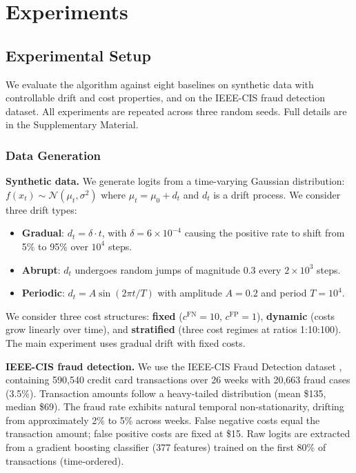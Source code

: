 \documentclass[12pt,a4paper]{article}
\begin{document}
\section{Experiments}
\label{sec:experiments}

\subsection{Experimental Setup}

We evaluate the algorithm against eight baselines on synthetic data with controllable drift and cost properties, and on the IEEE-CIS fraud detection dataset. All experiments are repeated across three random seeds. Full details are in the Supplementary Material.

\subsubsection{Data Generation}

\textbf{Synthetic data.} We generate logits from a time-varying Gaussian distribution: $f(x_t) \sim \mathcal{N}(\mu_t, \sigma^2)$ where $\mu_t = \mu_0 + d_t$ and $d_t$ is a drift process. We consider three drift types:
\begin{itemize}
    \item \textbf{Gradual}: $d_t = \delta \cdot t$, with $\delta = 6 \times 10^{-4}$ causing the positive rate to shift from 5\% to 95\% over $10^4$ steps.
    \item \textbf{Abrupt}: $d_t$ undergoes random jumps of magnitude 0.3 every $2 \times 10^3$ steps.
    \item \textbf{Periodic}: $d_t = A \sin(2\pi t / T)$ with amplitude $A = 0.2$ and period $T = 10^4$.
\end{itemize}

We consider three cost structures: \textbf{fixed} ($c^{\text{FN}} = 10$, $c^{\text{FP}} = 1$), \textbf{dynamic} (costs grow linearly over time), and \textbf{stratified} (three cost regimes at ratios 1:10:100). The main experiment uses gradual drift with fixed costs.

\textbf{IEEE-CIS fraud detection.} We use the IEEE-CIS Fraud Detection dataset \citep{IEEECIS2019}, containing 590,540 credit card transactions over 26 weeks with 20,663 fraud cases (3.5\%). Transaction amounts follow a heavy-tailed distribution (mean \$135, median \$69). The fraud rate exhibits natural temporal non-stationarity, drifting from approximately 2\% to 5\% across weeks. False negative costs equal the transaction amount; false positive costs are fixed at \$15. Raw logits are extracted from a gradient boosting classifier \citep{Tibshirani1996,ZouHastie2005} (377 features) trained on the first 80\% of transactions (time-ordered).
\end{document}
